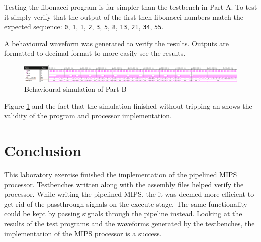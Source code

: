 \documentclass[CMPE]{../KGCOEReport}
\def\code#1{\texttt{#1}}
\begin{document}
	Testing the fibonacci program is far simpler than the testbench in
	Part A. To test it simply verify that the output of the first then
	fibonacci numbers match the expected sequence:
	\code{0}, \code{1}, \code{1}, \code{2}, \code{3}, \code{5},
	\code{8}, \code{13}, \code{21}, \code{34}, \code{55}.
	
	A behavioural waveform was generated to verify the results. Outputs are
	formatted to decimal format to more easily see the results.
	
	\begin{figure}[h!]
        \centering
        \includegraphics[width=\textwidth]{img/part_b_behav}
        \caption{Behavioural simulation of Part B}
        \label{fig:fib_behav}
	\end{figure}

	Figure \ref{fig:fib_behav} and the fact that the simulation finished
	without tripping an shows the validity of the program and processor 
	implementation.

    \section*{Conclusion}
    
    This laboratory exercise finished the implementation of the pipelined
    MIPS processor. Testbenches written along with the assembly files
    helped verify the processor. While writing the pipelined MIPS, the
    it was deemed more efficient to get rid of the passthrough signals
    on the execute stage. The same functionality could be kept by
    passing signals through the pipeline instead. Looking at the results
    of the test programs and the waveforms generated by the testbenches,
    the implementation of the MIPS processor is a success.

    \pagebreak
\end{document}
